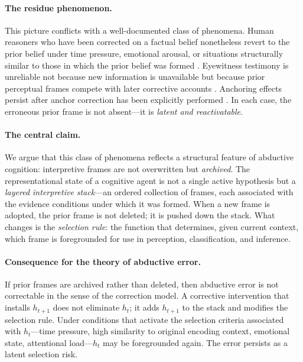 \documentclass[12pt]{article}
\begin{document}
\paragraph{The residue phenomenon.}
This picture conflicts with a well-documented class of phenomena.
Human reasoners who have been corrected on a factual belief
nonetheless revert to the prior belief under time pressure, emotional
arousal, or situations structurally similar to those in which the
prior belief was formed \cite{ecker2022}.
Eyewitness testimony is unreliable not because new information
is unavailable but because prior perceptual frames compete with
later corrective accounts \cite{loftus1979}.
Anchoring effects persist after anchor correction has been explicitly
performed \cite{epley2001}.
In each case, the erroneous prior frame is not absent---it is
\emph{latent and reactivatable}.

\paragraph{The central claim.}
We argue that this class of phenomena reflects a structural feature
of abductive cognition: interpretive frames are not overwritten but
\emph{archived}.
The representational state of a cognitive agent is not a single
active hypothesis but a \emph{layered interpretive stack}---an
ordered collection of frames, each associated with the evidence
conditions under which it was formed.
When a new frame is adopted, the prior frame is not deleted;
it is pushed down the stack.
What changes is the \emph{selection rule}: the function that
determines, given current context, which frame is foregrounded
for use in perception, classification, and inference.

\paragraph{Consequence for the theory of abductive error.}
If prior frames are archived rather than deleted, then abductive
error is not correctable in the sense of the correction model.
A corrective intervention that installs $h_{t+1}$ does not eliminate
$h_t$; it adds $h_{t+1}$ to the stack and modifies the selection
rule.
Under conditions that activate the selection criteria associated
with $h_t$---time pressure, high similarity to original encoding
context, emotional state, attentional load---$h_t$ may be
foregrounded again.
The error persists as a latent selection risk.
\end{document}
